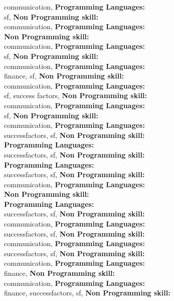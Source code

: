communication, \textbf{Programming Languages:} \\
sf, \textbf{Non Programming skill:} \\
communication, \textbf{Programming Languages:} \\
\textbf{Non Programming skill:} \\
communication, \textbf{Programming Languages:} \\
sf, \textbf{Non Programming skill:} \\
communication, \textbf{Programming Languages:} \\
finance, sf, \textbf{Non Programming skill:} \\
communication, \textbf{Programming Languages:} \\
sf, success factors, \textbf{Non Programming skill:} \\
communication, \textbf{Programming Languages:} \\
sf, \textbf{Non Programming skill:} \\
communication, \textbf{Programming Languages:} \\
successfactors, sf, \textbf{Non Programming skill:} \\
\textbf{Programming Languages:} \\
successfactors, sf, \textbf{Non Programming skill:} \\
\textbf{Programming Languages:} \\
successfactors, sf, \textbf{Non Programming skill:} \\
communication, \textbf{Programming Languages:} \\
\textbf{Non Programming skill:} \\
\textbf{Programming Languages:} \\
successfactors, sf, \textbf{Non Programming skill:} \\
communication, \textbf{Programming Languages:} \\
successfactors, sf, \textbf{Non Programming skill:} \\
communication, \textbf{Programming Languages:} \\
successfactors, sf, \textbf{Non Programming skill:} \\
communication, \textbf{Programming Languages:} \\
finance, \textbf{Non Programming skill:} \\
communication, \textbf{Programming Languages:} \\
finance, successfactors, sf, \textbf{Non Programming skill:} \\
